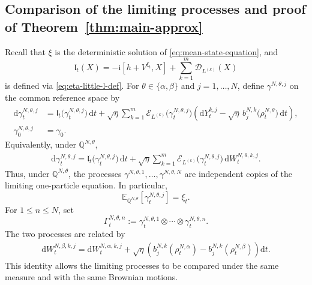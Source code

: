 \documentclass[10pt,a4paper,reqno]{amsart}
\numberwithin{equation}{section}
\theoremstyle{plain}
\theoremstyle{definition}
\theoremstyle{remark}
\renewcommand{\d}{\mathrm d}
\renewcommand{\i}{\mathrm i}
\newcommand{\E}{\mathbb E}
\newcommand{\Q}{\mathbb Q}
\newcommand{\cD}{\mathcal D}
\newcommand{\cE}{\mathcal E}
\newcommand{\1}{\mathbf 1}
\begin{document}
\subsection{Comparison of the limiting processes and proof of
Theorem~\ref{thm:main-approx}}
\label{subsec:limiting-comparison-perturbation}


Recall that \(\xi\) is the deterministic solution of
\eqref{eq:mean-state-equation}, and 
\[
  \mathfrak l_t(X)
  =
  -\i[h+V^{\xi_t},X]
  +
  \sum_{k=1}^m
  \cD_{L^{(k)}}(X)
 \]
 is defined via  \eqref{eq:eta-little-l-def}.  For
\(
  \theta\in\{\alpha,\beta\}
\)
and \(j=1,\ldots,N\), define \(\gamma^{N,\theta,j}\) on the common
reference space by
\begin{equation}
\begin{aligned}
  \d\gamma_t^{N,\theta,j}
  &=
  \mathfrak l_t
  \bigl(
    \gamma_t^{N,\theta,j}
  \bigr)\,\d t+
  \sqrt{\eta}
  \sum_{k=1}^m
  \cE_{L^{(k)}}
  \bigl(
    \gamma_t^{N,\theta,j}
  \bigr)
  \left(
    \d Y_t^{k,j}
    -
    \sqrt{\eta}\,
    b_j^{N,k}
    \bigl(
      \rho_t^{N,\theta}
    \bigr)\,\d t
  \right),
  \\
  \gamma_0^{N,\theta,j}
  &=
  \gamma_0.
\end{aligned}
  \label{eq:perturbation-gamma-observation-form}
\end{equation}
Equivalently, under \(\Q^{N,\theta}\),
\begin{equation}
\begin{aligned}
  \d\gamma_t^{N,\theta,j}
  =
  \mathfrak l_t
  \bigl(
    \gamma_t^{N,\theta,j}
  \bigr)\,\d t+
  \sqrt{\eta}
  \sum_{k=1}^m
  \cE_{L^{(k)}}
  \bigl(
    \gamma_t^{N,\theta,j}
  \bigr)
  \,\d W_t^{N,\theta,k,j}.
\end{aligned}
  \label{eq:perturbation-gamma-physical-form}
\end{equation}
Thus, under \(\Q^{N,\theta}\), the processes
\(
  \gamma^{N,\theta,1},
  \ldots,
  \gamma^{N,\theta,N}
\)
are independent copies of the limiting one-particle equation.  In
particular,
\begin{equation}
  \E_{\Q^{N,\theta}}
  \left[
    \gamma_t^{N,\theta,j}
  \right]
  =
  \xi_t.
  \label{eq:perturbation-gamma-mean}
\end{equation}
For \(1\le n\le N\), set
\begin{equation}
  \Gamma_t^{N,\theta,n}
  :=
  \gamma_t^{N,\theta,1}
  \otimes\cdots\otimes
  \gamma_t^{N,\theta,n}.
  \label{eq:perturbation-Gamma-theta}
\end{equation}
The two processes are related by
\begin{equation}
\begin{aligned}
  \d W_t^{N,\beta,k,j}
  =
  \d W_t^{N,\alpha,k,j}+
  \sqrt{\eta}
  \left(
    b_j^{N,k}(\rho_t^{N,\alpha})
    -
    b_j^{N,k}(\rho_t^{N,\beta})
  \right)\d t.
\end{aligned}
  \label{eq:perturbation-W-relation}
\end{equation}
This identity allows the limiting processes to be compared under the same
measure and with the same Brownian motions.
\end{document}
